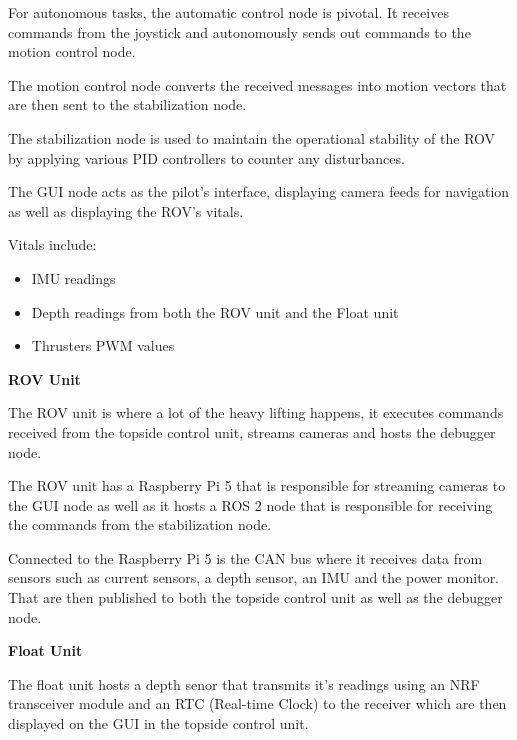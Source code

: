 \hspace{10pt} For autonomous tasks, the automatic control node is pivotal. It receives commands from the joystick and autonomously sends out commands to the motion control node.

\hspace{10pt} The motion control node converts the received messages into motion vectors that are then sent to the stabilization node.

\hspace{10pt} The stabilization node is used to maintain the operational stability of the ROV by applying various PID controllers to counter any disturbances.

\hspace{10pt} The GUI node acts as the pilot's interface, displaying camera feeds for navigation as well as displaying the ROV's vitals.

Vitals include: 
\vspace{-0.3\baselineskip}
\begin{itemize}
    \setlength{\itemsep}{0pt}
    \item IMU readings
    \item Depth readings from both the ROV unit and the Float unit
    \item Thrusters PWM values
\end{itemize}

\vspace{0.2cm}
\textbf{ROV Unit}

The ROV unit is where a lot of the heavy lifting happens, it executes commands received from the topside control unit, streams cameras and hosts the debugger node.

\hspace{10pt} The ROV unit has a Raspberry Pi 5 that is responsible for streaming cameras to the GUI node as well as it hosts a ROS 2 node that is responsible for receiving the commands from the stabilization node.

\hspace{10pt} Connected to the Raspberry Pi 5 is the CAN bus where it receives data from sensors such as current sensors, a depth sensor, an IMU and the power monitor.
That are then published to both the topside control unit as well as the debugger node.

\vspace{0.2cm}
\textbf{Float Unit}

The float unit hosts a depth senor that transmits it's readings using an NRF transceiver module and an RTC (Real-time Clock) to the receiver which are then displayed on the GUI in the topside control unit.

